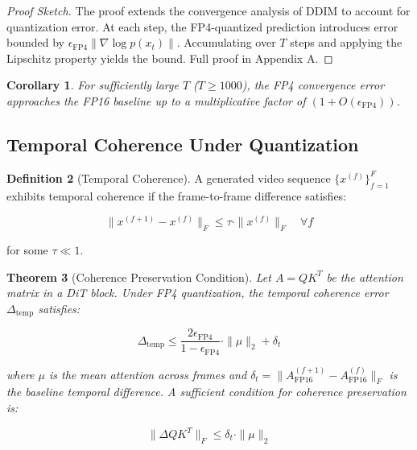 \documentclass[journal]{IEEEtran}
\newtheorem{theorem}{Theorem}[section]
\newtheorem{corollary}[theorem]{Corollary}
\theoremstyle{definition}
\newtheorem{definition}[theorem]{Definition}
\theoremstyle{remark}
\begin{document}
\begin{proof}[Proof Sketch]
The proof extends the convergence analysis of DDIM \cite{song2021denoising} to account for quantization error. At each step, the FP4-quantized prediction introduces error bounded by $\epsilon_{\text{FP4}} \|\nabla \log p(x_t)\|$. Accumulating over $T$ steps and applying the Lipschitz property yields the bound. Full proof in Appendix A.
\end{proof}

\begin{corollary}
For sufficiently large $T$ ($T \geq 1000$), the FP4 convergence error approaches the FP16 baseline up to a multiplicative factor of $(1 + O(\epsilon_{\text{FP4}}))$.
\end{corollary}

\subsection{Temporal Coherence Under Quantization}

\begin{definition}[Temporal Coherence]
A generated video sequence $\{x^{(f)}\}_{f=1}^F$ exhibits temporal coherence if the frame-to-frame difference satisfies:

\begin{equation}
\|x^{(f+1)} - x^{(f)}\|_F \leq \tau \cdot \|x^{(f)}\|_F \quad \forall f
\end{equation}

for some $\tau \ll 1$.
\end{definition}

\begin{theorem}[Coherence Preservation Condition]
Let $A = QK^T$ be the attention matrix in a DiT block. Under FP4 quantization, the temporal coherence error $\Delta_{\text{temp}}$ satisfies:

\begin{equation}
\Delta_{\text{temp}} \leq \frac{2\epsilon_{\text{FP4}}}{1 - \epsilon_{\text{FP4}}} \cdot \|\mu\|_2 + \delta_t
\end{equation}

where $\mu$ is the mean attention across frames and $\delta_t = \|A_{\text{FP16}}^{(f+1)} - A_{\text{FP16}}^{(f)}\|_F$ is the baseline temporal difference. A sufficient condition for coherence preservation is:

\begin{equation}
\|\Delta Q K^T\|_F \leq \delta_t \cdot \|\mu\|_2
\end{equation}
\end{theorem}
\end{document}
